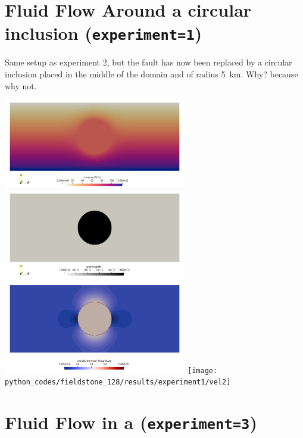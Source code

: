 \section*{Fluid Flow Around a circular inclusion ({\tt experiment=1})}

Same setup as experiment 2, but the fault has now been replaced by a circular inclusion 
placed in the middle of the domain and of radius 5~\si{\km}. Why? because why not.

\begin{center}
\includegraphics[width=8cm]{python_codes/fieldstone_128/results/experiment1/press}
\includegraphics[width=8cm]{python_codes/fieldstone_128/results/experiment1/K}\\
\includegraphics[width=8cm]{python_codes/fieldstone_128/results/experiment1/vel}
\texttt{[image: python\_codes/fieldstone\_128/results/experiment1/vel2]}
\end{center}


\section*{Fluid Flow in a  ({\tt experiment=3})}

